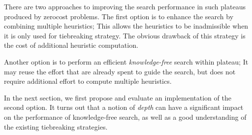 There are two approaches to improving the search performance in such plateaus
produced by zerocost problems. The first option is to enhance the search
by combining multiple heuristics; This allows the heuristics to be
inadmissible when it is only used for tiebreaking strategy. The obvious
drawback of this strategy is the cost of additional heuristic
computation.

Another option is to perform an efficient
\emph{knowledge-free} search within plateau; It may reuse the effort
that are already spent to guide the search, but does not require
additional effort to compute multiple heuristics.

In the next section, we first propose and evaluate an implementation of
the second option.  It turns out that a notion of \emph{depth} can have
a significant impact on the performance of knowledge-free search, as
well as a good understanding of the existing tiebreaking strategies.

